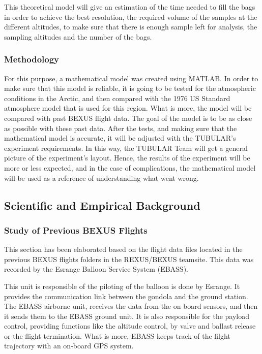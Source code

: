\documentclass[a4paper,12pt,oneside]{article} %
\begin{document}
\begin{appendices}
This theoretical model will give an estimation of the time needed to fill the bags in order to achieve the best resolution, the required volume of the samples at the different altitudes, to make sure that there is enough sample left for analysis, the sampling altitudes and the number of the bags.  

\subsubsection{Methodology}

For this purpose, a mathematical model was created using MATLAB. In order to make sure that this model is reliable, it is going to be tested for the atmospheric conditions in the Arctic, and then compared with the 1976 US Standard atmosphere model that is used for this region. What is more, the model will be compared with past BEXUS flight data. The goal of the model is to be as close as possible with these past data. 
After the tests, and making sure that the mathematical model is accurate, it will be adjusted with the TUBULAR's experiment requirements. In this way, the TUBULAR Team will get a general picture of the experiment's layout. Hence, the results of the experiment will be more or less expected, and in the case of complications, the mathematical model will be used as a reference of understanding what went wrong.


\subsection{Scientific and Empirical Background}

\subsubsection{Study of Previous BEXUS Flights}
This section has been elaborated based on the flight data files located in the previous BEXUS flights folders in the REXUS/BEXUS teamsite. This data was recorded by the Esrange Balloon Service System (EBASS).

\smallskip
This unit is responsible of the piloting of the balloon is done by Esrange. It provides the communication link between the gondola and the ground station. The EBASS airborne unit, receives the data from the on board sensors, and then it sends them to the EBASS ground unit. It is also responsible for the payload control, providing functions like the altitude control, by valve and ballast release or the flight termination. What is more, EBASS keeps track of the filght trajectory with an on-board GPS system.


\end{appendices}
\end{document}
